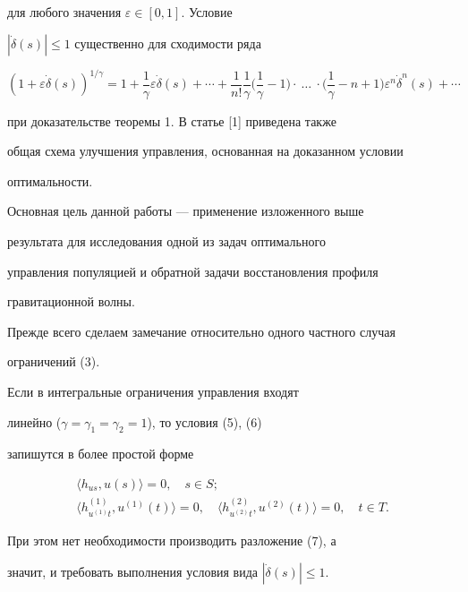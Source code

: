 для любого значения $\varepsilon \in [0,1]$. Условие


$|\Dot{\delta} (s)| \leq 1$ существенно для сходимости ряда


\begin{equation}


(1 + \varepsilon \Dot{\delta} (s))^{1/\gamma}=


1 + \frac{1}{\gamma}\varepsilon\Dot{\delta}(s) + \dotsb +


\frac{1}{n!} \frac{1} {\gamma} \bigg(\frac{1}{\gamma}


-1\bigg) \cdot\ \dotsc\ \cdot\bigg(\frac{1}{\gamma} - n +


1\bigg) \varepsilon^n  \Dot{\delta}^n (s) + \dotsb 


\end{equation}


при доказательстве теоремы 1. В статье [1] приведена также


общая схема улучшения управления, основанная на доказанном условии


оптимальности.





Основная цель данной работы --- применение изложенного выше


результата для исследования  одной из задач оптимального


управления популяцией и обратной задачи восстановления профиля


гравитационной волны.





Прежде всего сделаем замечание относительно одного частного случая


ограничений (3).





\begin{notenonum}


Если в интегральные ограничения управления входят


линейно ($\gamma{=} \gamma_1{=} \gamma_2{=} 1$), то условия (5), (6)


запишутся в более простой форме


\begin{gather*}


\langle h_{us},u(s) \rangle =


0, \quad s\in S; \\


\langle h^{(1)}_{u^{(1)}t},u^{(1)}(t) \rangle = 0, \quad


\langle h^{(2)}_{u^{(2)}t},u^{(2)}(t) \rangle = 0, \quad t\in T.


\end{gather*}


При этом нет необходимости производить разложение (7), а


значит, и требовать выполнения условия вида $|\Dot{\delta} (s)|\leq 1$.


\end{notenonum}








